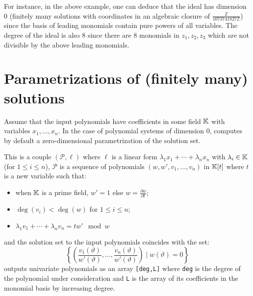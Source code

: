 \documentclass[a4paper,english,11pt]{scrartcl}
\theoremstyle{definition}
\theoremstyle{remark}
\def\leq{\leqslant}
\begin{document}
For instance, in the above example, one can deduce that the ideal has dimension
$0$ (finitely many solutions with coordinates in an algebraic closure of
$\frac{\mathbb{Z}}{1073741827\mathbb{Z}}$) since the basis of leading monomials
contain pure powers of all variables. The degree of the ideal is also $8$ since
there are $8$ monomials in $z_1, z_2, z_3$ which are not divisible by the above
leading monomials.

\section{Parametrizations of (finitely many) solutions}

Assume that the input polynomials have coefficients in some field $\mathbb{K}$ with
variables $x_1, \ldots, x_n$. In the case of polynomial systems of dimension
$0$, \msolve computes by default a zero-dimensional parametrization of the
solution set.

This is a couple $(\mathscr{P}, \ell)$ where $\ell$ is a linear form $\lambda_1
x_1 + \cdots + \lambda_n x_n$ with $\lambda_i\in \mathbb{K}$ (for $1\leq i \leq n$),
$\mathscr{P}$ is a sequence of polynomials $(w, w', v_1, \ldots, v_n)$ in
$\mathbb{K}[t]$ where $t$ is a new variable such that:
\begin{itemize}
\item when $\mathbb{K}$ is a prime field, $w'=1$ else $w = \frac{\partial w}{\partial
    t}$;
\item $\deg(v_i) < \deg(w)$ for $1\leq i \leq n$;
\item $\lambda_1 v_1 +\cdots +\lambda_n v_n = tw' \mod w$
\end{itemize}
and the solution set to the input polynomials coincides with the set:
\[
\left \{\left (\frac{v_1(\vartheta)}{w'(\vartheta)}, \ldots,
  \frac{v_n(\vartheta)}{w'(\vartheta)}\right ) \mid w(\vartheta) = 0
\right\}
\]
\msolve outputs univariate polynomials as an array \verb+[deg,L]+ where
\verb+deg+ is the degree of the polynomial under consideration and \verb+L+ is
the array of its coefficients in the monomial basis by increasing degree. 
\end{document}
